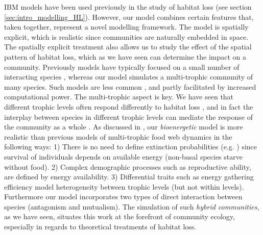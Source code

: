 IBM models have been used previously in the study of habitat loss (see section \ref{sec:intro_modelling_HL}). However, our model combines certain features that, taken together, represent a novel modelling framework. The model is spatially explicit, which is realistic since communities are naturally embedded in space. The spatially explicit treatment also allows us to study the effect of the spatial pattern of habitat loss, which as we have seen can determine the impact on a community. Previously models have typically focused on a small number of interacting species \cite{klausmeier2001habitat,jager2006simulated,melian2002food}, whereas our model simulates a multi-trophic community of many species. Such models are less common \cite{lurgi2015effects,grimm2013individual}, and partly facilitated by increased computational power. The multi-trophic aspect is key. We have seen that different trophic levels often respond differently to habitat loss \cite{sole2006ecological,duffy2003biodiversity,raffaelli2004extinction}, and in fact the interplay between species in different trophic levels can mediate the response of the community as a whole \cite{sole2006ecological}. As discussed in \cite{lurgi2015effects}, our \emph{bioenergetic} model is more realistic than previous models of multi-trophic food web dynamics \cite{mccann2005dynamics,brose2006allometric,pimm1979complexity} in the following ways: 1) There is no need to define extinction probabilities (e.g. \cite{sole2006ecological,fortuna2013habitat}) since survival of individuals depends on available energy (non-basal species starve without food). 2) Complex demographic processes such as reproductive ability, are defined by energy availability. 3) Differential traits such as energy gathering efficiency model heterogeneity between trophic levels (but not within levels). Furthermore our model incorporates two types of direct interaction between species (antagonism and mutualism). The simulation of such \emph{hybrid communities}, as we have seen, situates this work at the forefront of community ecology, especially in regards to theoretical treatments of habitat loss.        


